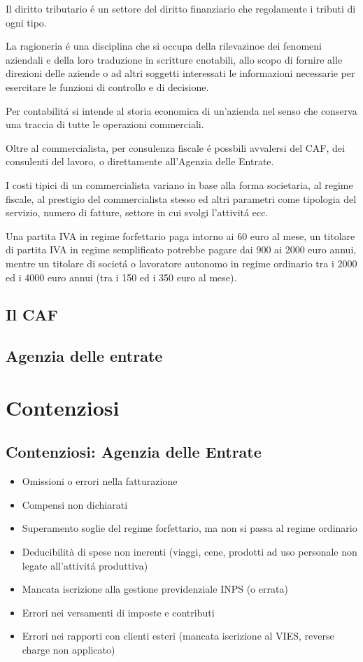 \documentclass{article}
\begin{document}
Il diritto tributario \'e un settore del diritto finanziario che regolamente i tributi di ogni tipo.

La ragioneria \'e una disciplina che si occupa della rilevazinoe dei fenomeni aziendali e della loro traduzione in scritture cnotabili, allo scopo di fornire alle direzioni delle aziende 
o ad altri soggetti interessati le informazioni necessarie per esercitare le funzioni di controllo e di decisione.

Per contabilit\'a si intende al storia economica di un'azienda nel senso che conserva una traccia di tutte le operazioni commerciali.

Oltre al commercialista, per consulenza fiscale \'e possbili avvalersi del CAF, dei consulenti del lavoro, o direttamente all'Agenzia delle Entrate.

I costi tipici di un commercialista variano in base alla forma societaria, al regime fiscale, al prestigio del commercialista stesso ed altri parametri come tipologia del servizio, numero di fatture, settore in cui svolgi l'attivit\'a ecc.

Una partita IVA in regime forfettario paga intorno ai 60 euro al mese,
un titolare di partita IVA in regime semplificato potrebbe pagare dai 900 ai 2000 euro annui, mentre
un titolare di societ\'a o lavoratore autonomo in regime ordinario tra i 2000 ed i 4000 euro annui (tra i 150 ed i 350 euro al mese).


\subsection{Il CAF}

\subsection{Agenzia delle entrate}



\section{Contenziosi}

\subsection{Contenziosi: Agenzia delle Entrate}
\begin{itemize}
    \item Omissioni o errori nella fatturazione
    \item Compensi non dichiarati
    \item Superamento soglie del regime forfettario, ma non si passa al regime ordinario
    \item Deducibilità di spese non inerenti (viaggi, cene, prodotti ad uso personale non legate all'attivit\'a produttiva)
    \item Mancata iscrizione alla gestione previdenziale INPS (o errata)
    \item Errori nei versamenti di imposte e contributi
    \item Errori nei rapporti con clienti esteri (mancata iscrizione al VIES, reverse charge non applicato)
\end{itemize}
\end{document}
